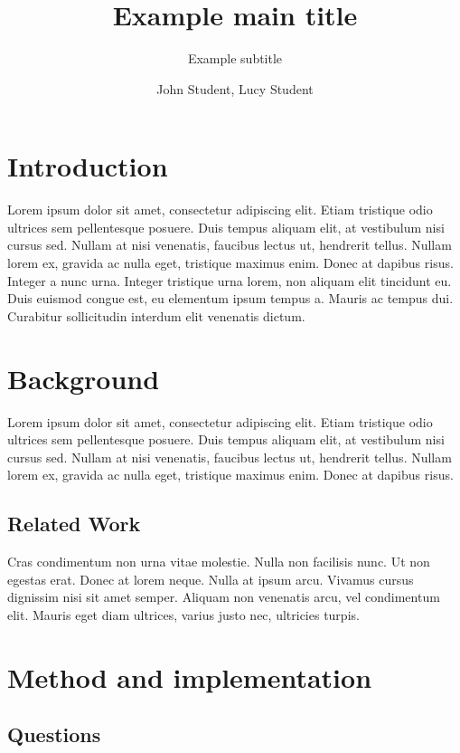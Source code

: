 \documentclass[11pt, a4paper]{resources/JTH}
\title{Example main title}
\subtitle{Example subtitle}
\author{John Student, Lucy Student}
\begin{document}
\maketitle

\tableofcontents

\newpage
{}
\section{Introduction}
    Lorem ipsum \cite{Breiman_1996} dolor sit amet, consectetur adipiscing elit. Etiam tristique odio ultrices sem pellentesque posuere. Duis tempus aliquam elit, at vestibulum nisi cursus sed. Nullam at nisi venenatis, faucibus lectus ut, hendrerit tellus. Nullam lorem ex, gravida ac nulla eget, tristique maximus enim. Donec at dapibus risus. Integer a nunc urna. Integer tristique urna lorem, non aliquam elit tincidunt eu. Duis euismod congue est, eu elementum ipsum tempus a. Mauris ac tempus dui. Curabitur sollicitudin interdum elit venenatis dictum. \citep{davidson1996c}

\section{Background}
    
    Lorem ipsum dolor sit amet, consectetur adipiscing elit. Etiam tristique odio ultrices sem pellentesque posuere. Duis tempus aliquam elit, at vestibulum nisi cursus sed. Nullam at nisi venenatis, faucibus lectus ut, hendrerit tellus. Nullam lorem ex, gravida ac nulla eget, tristique maximus enim. Donec at dapibus risus. \citep{freeman2002example}

    \subsection{Related Work}

        Cras condimentum non urna vitae molestie. Nulla non facilisis nunc. Ut non egestas erat. Donec at lorem neque. Nulla at ipsum arcu. Vivamus cursus dignissim nisi sit amet semper. Aliquam non venenatis arcu, vel condimentum elit. Mauris eget diam ultrices, varius justo nec, ultricies turpis. \citep{zloof1977query}

\section{Method and implementation}
    \subsection{Questions}
    
\end{document}
